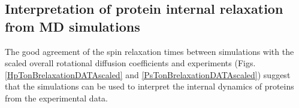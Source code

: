 \documentclass[pre,aps,floatfix,authordate1-4,twocolumn]{revtex4-1}
\begin{document}



\subsection{Interpretation of protein internal relaxation from MD simulations}
The good agreement of the spin relaxation times between simulations
with the scaled overall rotational diffusion coefficients and
experiments (Figs. \ref{HpTonBrelaxationDATAscaled} and \ref{PsTonBrelaxationDATAscaled})
suggest that the simulations can be used to interpret the internal
dynamics of proteins from the experimental data.
\end{document}
